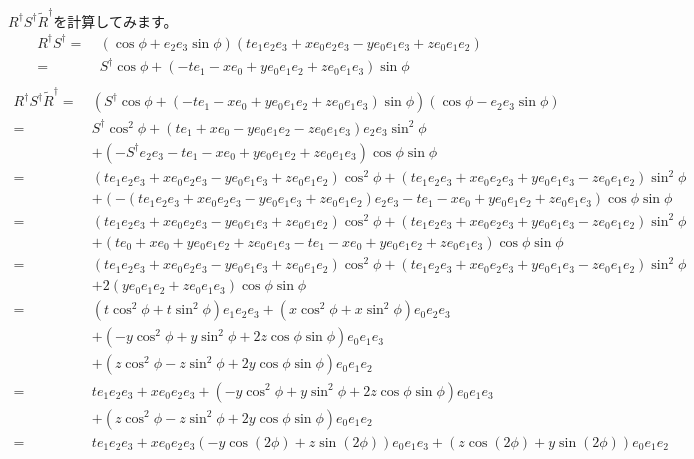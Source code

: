 \documentclass[a4paper,12pt,notitlepage]{jsreport}
\begin{document}
$R^\dag S^\dag\widetilde{R}^\dag$を計算してみます。
\begin{equation}
  \begin{split}
    R^\dag S^\dag=~&(\cos\phi+e_2e_3\sin\phi)(te_1e_2e_3+xe_0e_2e_3-ye_0e_1e_3+ze_0e_1e_2)\\
    =~&S^\dag\cos\phi+(-te_1-xe_0+ye_0e_1e_2+ze_0e_1e_3)\sin\phi\\
  \end{split}
\end{equation}
\begin{equation}
  \begin{split}
    R^\dag S^\dag\widetilde{R}^\dag=~&(S^\dag\cos\phi+(-te_1-xe_0+ye_0e_1e_2+ze_0e_1e_3)\sin\phi)(\cos\phi-e_2e_3\sin\phi)\\
    =~&S^\dag\cos^2\phi+(te_1+xe_0-ye_0e_1e_2-ze_0e_1e_3)e_2e_3\sin^2\phi\\
    &+(-S^\dag e_2e_3-te_1-xe_0+ye_0e_1e_2+ze_0e_1e_3)\cos\phi\sin\phi\\
    =~&(te_1e_2e_3+xe_0e_2e_3-ye_0e_1e_3+ze_0e_1e_2)\cos^2\phi+(te_1e_2e_3+xe_0e_2e_3+ye_0e_1e_3-ze_0e_1e_2)\sin^2\phi\\
    &+(-(te_1e_2e_3+xe_0e_2e_3-ye_0e_1e_3+ze_0e_1e_2)e_2e_3-te_1-xe_0+ye_0e_1e_2+ze_0e_1e_3)\cos\phi\sin\phi\\
    =~&(te_1e_2e_3+xe_0e_2e_3-ye_0e_1e_3+ze_0e_1e_2)\cos^2\phi+(te_1e_2e_3+xe_0e_2e_3+ye_0e_1e_3-ze_0e_1e_2)\sin^2\phi\\
    &+(te_0+xe_0+ye_0e_1e_2+ze_0e_1e_3-te_1-xe_0+ye_0e_1e_2+ze_0e_1e_3)\cos\phi\sin\phi\\
    =~&(te_1e_2e_3+xe_0e_2e_3-ye_0e_1e_3+ze_0e_1e_2)\cos^2\phi+(te_1e_2e_3+xe_0e_2e_3+ye_0e_1e_3-ze_0e_1e_2)\sin^2\phi\\
    &+2(ye_0e_1e_2+ze_0e_1e_3)\cos\phi\sin\phi\\
    =~&(t\cos^2\phi+t\sin^2\phi)e_1e_2e_3+(x\cos^2\phi+x\sin^2\phi)e_0e_2e_3\\
    &+(-y\cos^2\phi+y\sin^2\phi+2z\cos\phi\sin\phi)e_0e_1e_3\\
    &+(z\cos^2\phi-z\sin^2\phi+2y\cos\phi\sin\phi)e_0e_1e_2\\
    =~&te_1e_2e_3+xe_0e_2e_3+(-y\cos^2\phi+y\sin^2\phi+2z\cos\phi\sin\phi)e_0e_1e_3\\
    &+(z\cos^2\phi-z\sin^2\phi+2y\cos\phi\sin\phi)e_0e_1e_2\\
    =~&te_1e_2e_3+xe_0e_2e_3(-y\cos(2\phi)+z\sin(2\phi))e_0e_1e_3+(z\cos(2\phi)+y\sin(2\phi))e_0e_1e_2\\
  \end{split}
\end{equation}
\end{document}
